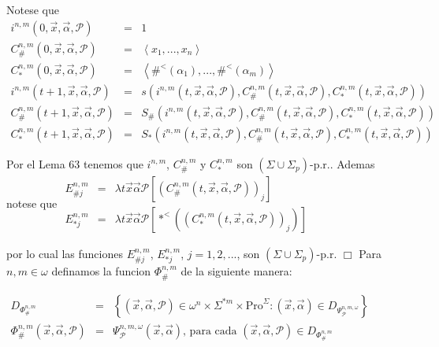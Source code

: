 Notese que
\(\displaystyle \begin{array}{rcl} i^{n,m}(0,\vec{x},\vec{\alpha},\mathcal{P}) & =& 1 \\ C_{\#}^{n,m}(0,\vec{x},\vec{\alpha},\mathcal{P}) & =& \left\langle x_{1},...,x_{n}\right\rangle \\ C_{\ast }^{n,m}(0,\vec{x},\vec{\alpha},\mathcal{P}) & =& \left\langle \#^{< }(\alpha _{1}),...,\#^{< }(\alpha _{m})\right\rangle \\ i^{n,m}(t+1,\vec{x},\vec{\alpha},\mathcal{P}) & =& s(i^{n,m}(t,\vec{x},\vec{ \alpha},\mathcal{P}),C_{\#}^{n,m}(t,\vec{x},\vec{\alpha},\mathcal{P} ),C_{\ast }^{n,m}(t,\vec{x},\vec{\alpha},\mathcal{P})) \\ C_{\#}^{n,m}(t+1,\vec{x},\vec{\alpha},\mathcal{P}) & =& S_{\#}(i^{n,m}(t,\vec{x },\vec{\alpha},\mathcal{P}),C_{\#}^{n,m}(t,\vec{x},\vec{\alpha},\mathcal{P} ),C_{\ast }^{n,m}(t,\vec{x},\vec{\alpha},\mathcal{P})) \\ C_{\ast }^{n,m}(t+1,\vec{x},\vec{\alpha},\mathcal{P}) & =& S_{\ast }(i^{n,m}(t, \vec{x},\vec{\alpha},\mathcal{P}),C_{\#}^{n,m}(t,\vec{x},\vec{\alpha}, \mathcal{P}),C_{\ast }^{n,m}(t,\vec{x},\vec{\alpha},\mathcal{P})) \end{array} \)

Por el Lema 63 tenemos que \(i^{n,m}\), \( C_{\#}^{n,m}\) y \(C_{\ast }^{n,m}\) son \((\Sigma \cup \Sigma _{p})\)-p.r.. Ademas notese que
\(\displaystyle \begin{array}{rcl} E_{\#j}^{n,m} & =& \lambda t\vec{x}\vec{\alpha}\mathcal{P}\left[ (C_{\#}^{n,m}(t,\vec{x},\vec{\alpha},\mathcal{P}))_{j}\right] \\ E_{\ast j}^{n,m} & =& \lambda t\vec{x}\vec{\alpha}\mathcal{P}\left[ \ast ^{< }((C_{\ast }^{n,m}(t,\vec{x},\vec{\alpha},\mathcal{P}))_{j})\right] \end{array} \)

por lo cual las funciones \(E_{\#j}^{n,m}\), \(E_{\ast j}^{n,m}\), \(j=1,2,...\), son \((\Sigma \cup \Sigma _{p})\)-p.r. \(\Box\)
Para \(n,m\in \omega \) definamos la funcion \(\Phi _{\#}^{n,m}\) de la siguiente manera:

\(\displaystyle \begin{array}{rcl} D_{\Phi _{\#}^{n,m}} & =& \left\{ (\vec{x},\vec{\alpha},\mathcal{P})\in \omega ^{n}\times \Sigma ^{\ast m}\times \mathrm{Pro}^{\Sigma }:(\vec{x},\vec{\alpha })\in D_{\Psi _{\mathcal{P}}^{n,m,\omega }}\right\} \\ \Phi _{\#}^{n,m}(\vec{x},\vec{\alpha},\mathcal{P}) & =& \Psi _{\mathcal{P} }^{n,m,\omega }(\vec{x},\vec{\alpha})\text{, para cada }(\vec{x},\vec{\alpha} ,\mathcal{P})\in D_{\Phi _{\#}^{n,m}} \end{array} \)

